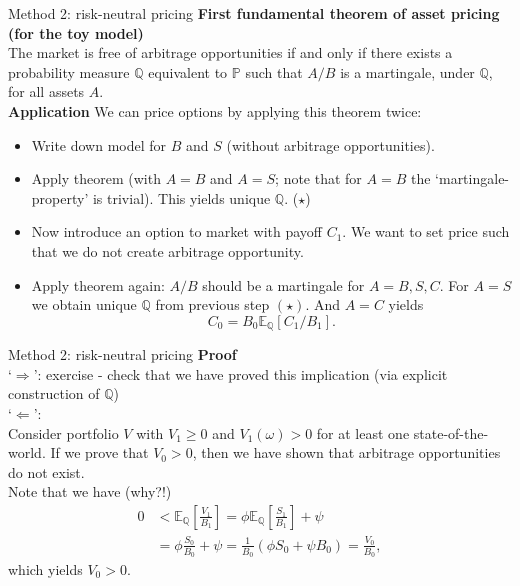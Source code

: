\documentclass[pdf, handout]{beamer}
\begin{document}
\begin{frame}{Method 2: risk-neutral pricing}
\textbf{First fundamental theorem of asset pricing (for the toy model)} \\
The market is free of arbitrage opportunities if and only if there exists a probability measure $\mathbb{Q}$ equivalent to $\mathbb{P}$
 such that $A/B$ is a martingale, under $\mathbb{Q}$, for all assets $A$.
\\ \vspace{.5cm}
\textbf{Application} We can price options by applying this theorem twice:
\begin{itemize}
\item Write down model for $B$ and $S$ (without arbitrage opportunities).
\item  Apply theorem (with $A= B$ and $A=S$; note that for $A=B$ the `martingale-property' is  trivial). This yields unique $\mathbb{Q}$.  ($\star$)
\item Now introduce an option to market with payoff $C_1$. We want to set
price such that we do not create arbitrage opportunity.
\item Apply theorem again: $A/B$ should be a martingale for $A=B, S, C$. For $A=S$ we obtain unique $\mathbb{Q}$ from previous step $(\star)$. 
And $A=C$ yields
\[
C_0 = B_0 \mathbb{E}_{\mathbb{Q}}[ C_1/B_1].
\]
\end{itemize}
\end{frame}

\begin{frame}{Method 2: risk-neutral pricing}
\textbf{Proof} \\
`$\Rightarrow$':  exercise - check that we have proved this implication
(via explicit construction of $\mathbb{Q}$) \\
`$\Leftarrow$': \\
Consider portfolio $V$  with $V_1\geq 0$ and $V_1(\omega) >0$ for at least one state-of-the-world. If we prove that $V_0 > 0$, then we have shown that arbitrage opportunities do not exist. \\
Note that we have (why?!)
\begin{align*}
0 &< \mathbb{E}_{\mathbb{Q}}\left[ \frac{V_1}{B_1} \right]
=
\phi\mathbb{E}_{\mathbb{Q}}\left[ \frac{S_1}{B_1} \right] + \psi
\\ 
&= \phi \frac{S_0}{B_0} + \psi = \frac{1}{B_0}(\phi S_0 + \psi B_0)
= \frac{V_0}{B_0},
\end{align*}
which yields $V_0>0$.
\end{frame}
\end{document}
